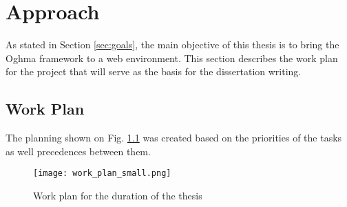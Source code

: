 \chapter{Approach}\label{chap:approach}

As stated in Section \ref{sec:goals}, the main objective of this thesis is to bring the Oghma framework to a web environment. This section describes the work plan for the project that will serve as the basis for the dissertation writing.

\section{Work Plan}\label{sec:work_plan}

The planning shown on Fig. \ref{fig:work_plan} was created based on the priorities of the tasks as well precedences between them.

\begin{figure}[h]
  \texttt{[image: work\_plan\_small.png]}
  \caption{Work plan for the duration of the thesis}
  \label{fig:work_plan}
\end{figure}

